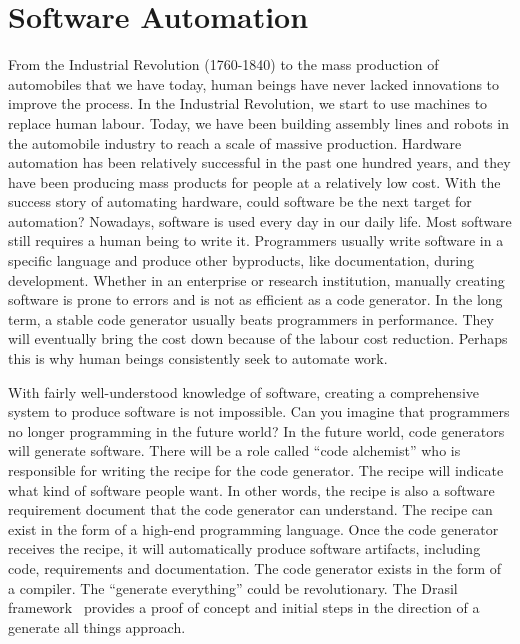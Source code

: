 \chapter{Software Automation}
From the Industrial Revolution (1760-1840) to the mass production of automobiles that we have today, human beings have never lacked innovations to improve the process. In the Industrial Revolution, we start to use machines to replace human labour. Today, we have been building assembly lines and robots in the automobile industry to reach a scale of massive production. Hardware automation has been relatively successful in the past one hundred years, and they have been producing mass products for people at a relatively low cost. With the success story of automating hardware, could software be the next target for automation? Nowadays, software is used every day in our daily life. Most software still requires a human being to write it. Programmers usually write software in a specific language and produce other byproducts, like documentation, during development. Whether in an enterprise or research institution, manually creating software is prone to errors and is not as efficient as a code generator. In the long term, a stable code generator usually beats programmers in performance. They will eventually bring the cost down because of the labour cost reduction. Perhaps this is why human beings consistently seek to automate work. 

With fairly well-understood knowledge of software, creating a comprehensive system to produce software is not impossible. Can you imagine that programmers no longer programming in the future world? In the future world, code generators will generate software. There will be a role called ``code alchemist'' who is responsible for writing the recipe for the code generator. The recipe will indicate what kind of software people want. In other words, the recipe is also a software requirement document that the code generator can understand. The recipe can exist in the form of a high-end programming language. Once the code generator receives the recipe, it will automatically produce software artifacts, including code, requirements and documentation. The code generator exists in the form of a compiler. The ``generate everything'' could be revolutionary. The Drasil framework~\citep{drasil} provides a proof of concept and initial steps in the direction of a generate all things approach.
